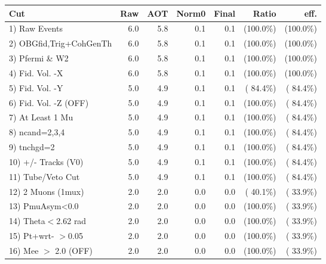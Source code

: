  \begin{table}[h!]\centering
 \begin{tabular}{||l||r|r|r|r|r|r||}
 \hline
 \hline
 Cut & Raw & AOT & Norm0 & Final & Ratio & eff.       \\
 \hline
  1) Raw Events           &          6.0 &          5.8 &          0.1 &          0.1 & (100.0\%) & (100.0\%) \\
  2) OBGfid,Trig+CohGenTh &          6.0 &          5.8 &          0.1 &          0.1 & (100.0\%) & (100.0\%) \\
  3) Pfermi \& W2         &          6.0 &          5.8 &          0.1 &          0.1 & (100.0\%) & (100.0\%) \\
  4) Fid. Vol. -X         &          6.0 &          5.8 &          0.1 &          0.1 & (100.0\%) & (100.0\%) \\
  5) Fid. Vol. -Y         &          5.0 &          4.9 &          0.1 &          0.1 & ( 84.4\%) & ( 84.4\%) \\
  6) Fid. Vol. -Z (OFF)   &          5.0 &          4.9 &          0.1 &          0.1 & (100.0\%) & ( 84.4\%) \\
  7) At Least 1 Mu        &          5.0 &          4.9 &          0.1 &          0.1 & (100.0\%) & ( 84.4\%) \\
  8) ncand=2,3,4          &          5.0 &          4.9 &          0.1 &          0.1 & (100.0\%) & ( 84.4\%) \\
  9) tnchgd=2             &          5.0 &          4.9 &          0.1 &          0.1 & (100.0\%) & ( 84.4\%) \\
 10) +/- Tracks (V0)      &          5.0 &          4.9 &          0.1 &          0.1 & (100.0\%) & ( 84.4\%) \\
 11) Tube/Veto Cut        &          5.0 &          4.9 &          0.1 &          0.1 & (100.0\%) & ( 84.4\%) \\
 12) 2 Muons (1mux)       &          2.0 &          2.0 &          0.0 &          0.0 & ( 40.1\%) & ( 33.9\%) \\
 13) PmuAsym<0.0          &          2.0 &          2.0 &          0.0 &          0.0 & (100.0\%) & ( 33.9\%) \\
 14) Theta$<$2.62 rad     &          2.0 &          2.0 &          0.0 &          0.0 & (100.0\%) & ( 33.9\%) \\
 15) Pt+wrt- $>$0.05      &          2.0 &          2.0 &          0.0 &          0.0 & (100.0\%) & ( 33.9\%) \\
 16) Mee $>$ 2.0  (OFF)   &          2.0 &          2.0 &          0.0 &          0.0 & (100.0\%) & ( 33.9\%) \\

\end{tabular}
\end{table}
